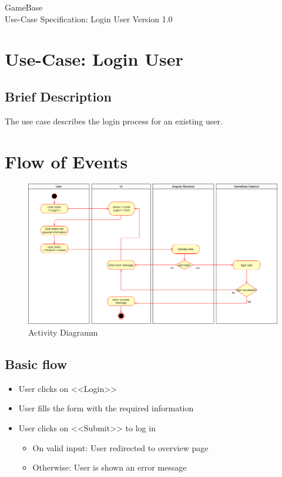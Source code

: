 \documentclass[a4paper,12pt,chapterprefix=false,bibliography=totoc,listof=totoc,book]{scrreprt}
\begin{document}
    \begin{flushright}
        GameBase
        \\
        Use-Case Specification: Login User
        \bigbreak
        Version 1.0
    \end{flushright}

    \tableofcontents

    \chapter{Use-Case: Login User}

    \section{Brief Description}
    The use case describes the login process for an existing user.

    \chapter{Flow of Events}
    \begin{figure}[H]
        \includegraphics[width=\textwidth]{diagramms/UCLoginUserDiagramm.png}
        \caption{Activity Diagramm}
        \label{fig:ucd}
    \end{figure}
    \section{Basic flow}

    \begin{itemize}
        \item User clicks on <<Login>>
        \item User fills the form with the required information
        \item User clicks on <<Submit>> to log in
        \begin{itemize}
            \item On valid input: User redirected to overview page
            \item Otherwise: User is shown an error message
        \end{itemize}
    \end{itemize}
\end{document}
